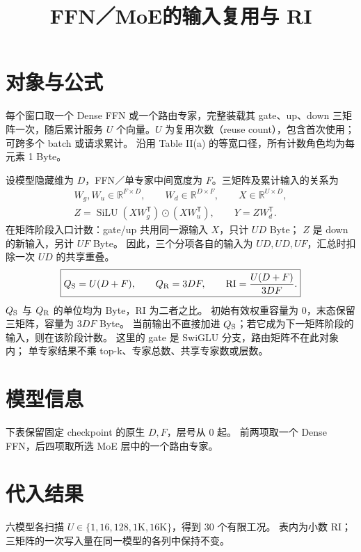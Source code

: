 
\renewcommand{\WorkloadName}{FFN／MoE}
\title{\bfseries\WorkloadName 的输入复用与 RI}

\maketitle

\section{对象与公式}
每个窗口取一个 Dense FFN 或一个路由专家，完整装载其 gate、up、down
三矩阵一次，随后累计服务 $U$ 个向量。$U$ 为复用次数（reuse count），包含首次使用；可跨多个 batch 或请求累计。
沿用 Table II(a) 的等宽口径，所有计数角色均为每元素 1 Byte。

设模型隐藏维为 $D$，FFN／单专家中间宽度为 $F$。三矩阵及累计输入的关系为
\[
 \begin{gathered}
 W_g,W_u\in\mathbb{R}^{F\times D},\qquad W_d\in\mathbb{R}^{D\times F},\qquad
 X\in\mathbb{R}^{U\times D},\\
 Z=\operatorname{SiLU}(XW_g^{\mathsf T})\odot(XW_u^{\mathsf T}),\qquad
 Y=ZW_d^{\mathsf T}.
 \end{gathered}
\]
在矩阵阶段入口计数：gate/up 共用同一源输入 $X$，只计 $UD$ Byte；
$Z$ 是 down 的新输入，另计 $UF$ Byte。
因此，三个分项各自的输入为 $UD,UD,UF$，汇总时扣除一次 $UD$ 的共享重叠。
\[
 \boxed{Q_{\mathrm S}=U(D+F),\qquad Q_{\mathrm R}=3DF,\qquad
 \mathrm{RI}=\frac{U(D+F)}{3DF}.}
\]
$Q_{\mathrm S}$ 与 $Q_{\mathrm R}$ 的单位均为 Byte，RI 为二者之比。
初始有效权重容量为 0，末态保留三矩阵，容量为 $3DF$ Byte。
当前输出不直接加进 $Q_{\mathrm S}$；若它成为下一矩阵阶段的输入，则在该阶段计数。
这里的 gate 是 SwiGLU 分支，路由矩阵不在此对象内；
单专家结果不乘 top-k、专家总数、共享专家数或层数。

\section{模型信息}
下表保留固定 checkpoint 的原生 $D,F$，层号从 0 起。
前两项取一个 Dense FFN，后四项取所选 MoE 层中的一个路由专家。
\begin{center}\small\end{center}

\newpage
\section{代入结果}
六模型各扫描 $U\in\{1,16,128,1\mathrm{K},16\mathrm{K}\}$，得到 30 个有限工况。
表内为小数 RI；三矩阵的一次写入量在同一模型的各列中保持不变。
\begin{center}\small\end{center}
\DisplayNote

